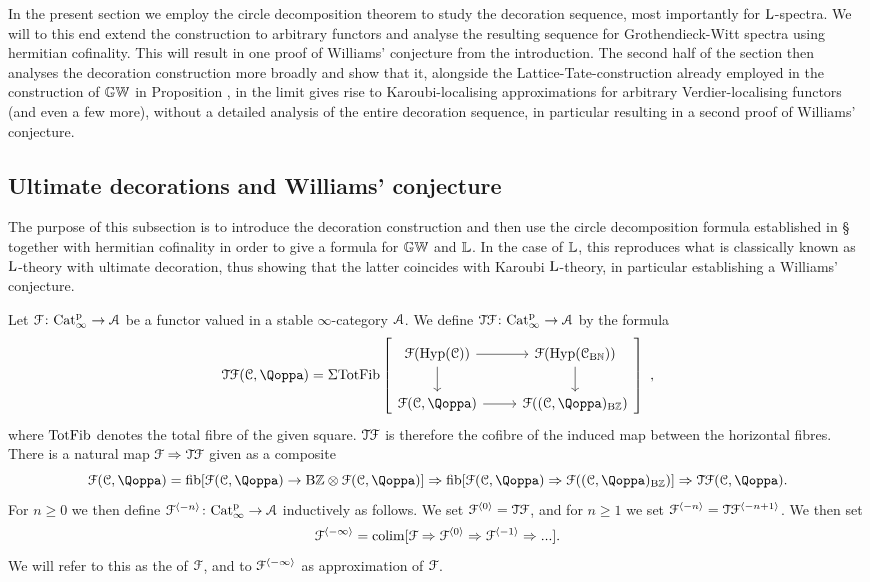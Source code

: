 In the present section we employ the circle decomposition theorem to study the decoration sequence, most importantly for $\operatorname L$-spectra. We will to this end extend the construction to arbitrary functors and analyse the resulting sequence for Grothendieck-Witt spectra using hermitian cofinality. This will result in one proof of Williams' conjecture from the introduction. The second half of the section then analyses the decoration construction more broadly and show that it, alongside the Lattice-Tate-construction already employed in the construction of $\mathbb{GW}$ in Proposition , in the limit gives rise to Karoubi-localising approximations for arbitrary Verdier-localising functors (and even a few more), without a detailed analysis of the entire decoration sequence, in particular resulting in a second proof of Williams' conjecture.



\subsection{Ultimate decorations and Williams' conjecture}
\label{subsection:universal-dec}%

The purpose of this subsection is to introduce the decoration construction and then use the circle decomposition formula established in \S{} together with hermitian cofinality in order to give a formula for $\mathbb{GW}$ and $\mathbb{L}$. In the case of $\mathbb{L}$, this reproduces what is classically known as $\operatorname L$-theory with ultimate decoration, thus showing that the latter coincides with Karoubi $\operatorname L$-theory, in particular establishing a Williams' conjecture.  



 

\begin{definition}
\label{definition:decoration}%
Let $\mathcal{F} \colon \mathrm{Cat}^{\mathrm p}_\infty \to \mathcal{A}$ be a functor valued in a stable $\infty$-category $\mathcal{A}$. We define $\mathcal{T}\mathcal{F}\colon \mathrm{Cat}^{\mathrm p}_\infty \to \mathcal{A}$ by the formula
\[
\T\F(\C,\QF) = \Sig\TotFib\left[
\begin{tikzcd}
\F(\Hyp(\C)) \ar[r]\ar[d] & \F(\Hyp(\C_{\B\NN})) \ar[d] \\
\F(\C,\QF) \ar[r] & \F((\C,\QF)_{\B\ZZ})
\end{tikzcd}\right] \ ,
\]
where $\mathrm{TotFib}$ denotes the total fibre of the given square. $\mathcal{T}\mathcal{F}$ is therefore the cofibre of the induced map between the horizontal fibres. There is a natural map $\mathcal{F} \Rightarrow \mathcal{T}\mathcal{F}$ given as a composite
\[
\F(\C,\QF) = \fib[\F(\C,\QF) \to \B\ZZ \otimes \F(\C,\QF)] \Rightarrow \fib[\F(\C,\QF) \Rightarrow \F((\C,\QF)_{\B\ZZ})] \Rightarrow \T\F(\C,\QF).
\]
For $n \geq 0$ we then define $\mathcal{F}^{\langle -n \rangle}\colon \mathrm{Cat}^{\mathrm p}_\infty \to \mathcal{A}$ inductively as follows. We set $\mathcal{F}^{\langle 0 \rangle} = \mathcal{T}\mathcal{F}$, and for $n \geq 1$ we set $\mathcal{F}^{\langle -n \rangle} = \mathcal{T}\mathcal{F}^{\langle -n+1 \rangle}$. We then set
\[
\mathcal{F}^{\langle -\infty \rangle} = \mathop{\mathrm{colim}}[\mathcal{F} \Rightarrow \mathcal{F}^{\langle 0 \rangle} \Rightarrow \mathcal{F}^{\langle -1 \rangle} \Rightarrow ... ].
\]
We will refer to this as the  of $\mathcal{F}$, and to $\mathcal{F}^{\langle -\infty \rangle}$ as  approximation of $\mathcal{F}$. 
\end{definition}




